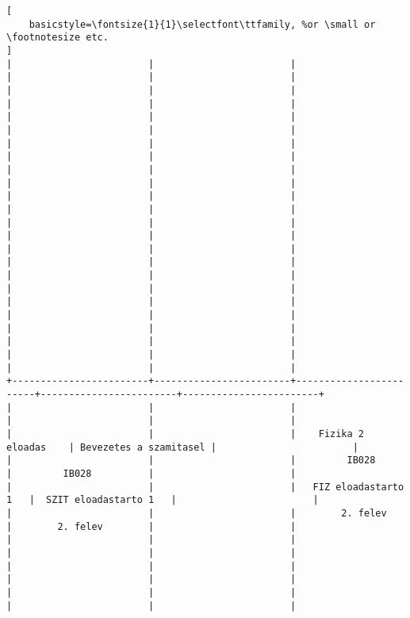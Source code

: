\begin{lstlisting}[
    basicstyle=\fontsize{1}{1}\selectfont\ttfamily, %or \small or \footnotesize etc.
]
|                        |                        |                        |                        |                        | 
|                        |                        |                        |                        |                        | 
|                        |                        |                        |                        |                        | 
|                        |                        |                        |                        |                        | 
|                        |                        |                        |                        |                        | 
|                        |                        |                        |                        |                        | 
|                        |                        |                        |                        |                        | 
|                        |                        |                        |                        |                        | 
|                        |                        |                        |                        |                        | 
|                        |                        |                        |                        |                        | 
|                        |                        |                        |                        |                        | 
|                        |                        |                        |                        |                        | 
+------------------------+------------------------+------------------------+------------------------+------------------------+
|                        |                        |                        |                        |                        | 
|                        |                        |    Fizika 2 eloadas    | Bevezetes a szamitasel |                        | 
|                        |                        |         IB028          |         IB028          |                        | 
|                        |                        |   FIZ eloadastarto 1   |  SZIT eloadastarto 1   |                        | 
|                        |                        |        2. felev        |        2. felev        |                        | 
|                        |                        |                        |                        |                        | 
|                        |                        |                        |                        |                        | 
|                        |                        |                        |                        |                        | 

\end{lstlisting}
